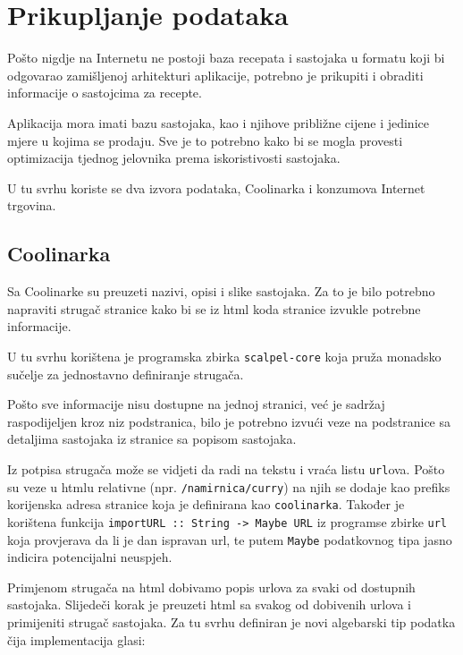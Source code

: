 \chapter{Prikupljanje podataka}

Pošto nigdje na Internetu ne postoji baza recepata i sastojaka u formatu koji bi odgovarao zamišljenoj arhitekturi aplikacije, potrebno je prikupiti i obraditi informacije o sastojcima za recepte.

Aplikacija mora imati bazu sastojaka, kao i njihove približne cijene i jedinice mjere u kojima se prodaju. Sve je to potrebno kako bi se mogla provesti optimizacija tjednog jelovnika prema iskoristivosti sastojaka.

U tu svrhu koriste se dva izvora podataka, Coolinarka i konzumova Internet trgovina.

\section{Coolinarka}

Sa Coolinarke su preuzeti nazivi, opisi i slike sastojaka. Za to je bilo potrebno napraviti strugač stranice  kako bi se iz \acs{html} koda stranice izvukle potrebne informacije.

U tu svrhu korištena je programska zbirka  \texttt{scalpel-core} koja pruža monadsko sučelje za jednostavno definiranje strugača.

Pošto sve informacije nisu dostupne na jednoj stranici, već je sadržaj raspodijeljen kroz niz podstranica, bilo je potrebno izvući veze  na podstranice sa detaljima sastojaka iz stranice sa popisom sastojaka.


Iz potpisa strugača može se vidjeti da radi na tekstu i vraća listu \texttt{\acs{url}}ova. Pošto su veze u \acs{html}u relativne (npr. \texttt{/namirnica/curry}) na njih se dodaje kao prefiks korijenska  adresa stranice koja je definirana kao \texttt{coolinarka}. Također je korištena funkcija \texttt{importURL :: String -> Maybe URL} iz programse zbirke \texttt{url} koja provjerava da li je dan ispravan \acs{url}, te putem \texttt{Maybe} podatkovnog tipa jasno indicira potencijalni neuspjeh.

Primjenom strugača na \acs{html} dobivamo popis \acs{url}ova za svaki od dostupnih sastojaka. Slijedeči korak je preuzeti \acs{html} sa svakog od dobivenih \acs{url}ova i primijeniti strugač sastojaka. Za tu svrhu definiran je novi algebarski tip podatka čija implementacija glasi:

